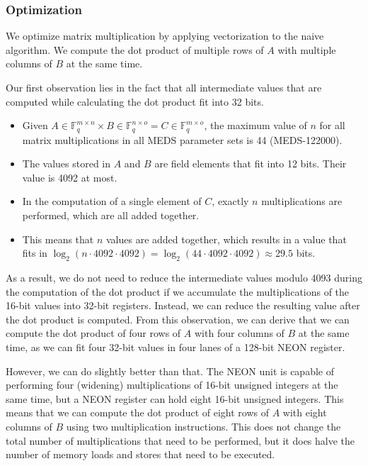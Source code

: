 \documentclass[11pt,a4paper]{report}
\theoremstyle{definition}
\begin{document}
\subsubsection{Optimization}
\label{sec:matrixmultiplicationoptimization}
We optimize matrix multiplication by applying vectorization to the naive algorithm. We compute the dot product of multiple rows of $A$ with multiple columns of $B$ at the same time.

Our first observation lies in the fact that all intermediate values that are computed while calculating the dot product fit into 32 bits.
\begin{itemize}
  \item Given $A \in \mathbb{F}_q^{m \times n} \times B \in \mathbb{F}_q^{n \times o} = C \in \mathbb{F}_q^{m \times o}$, the maximum value of $n$ for all matrix multiplications in all MEDS parameter sets is 44 (MEDS-122000).
  \item The values stored in $A$ and $B$ are field elements that fit into 12 bits. Their value is 4092 at most.
  \item In the computation of a single element of $C$, exactly $n$ multiplications are performed, which are all added together.
  \item This means that $n$ values are added together, which results in a value that fits in $\log_2(n \cdot 4092 \cdot 4092) = \log_2(44 \cdot 4092 \cdot 4092) \approx 29.5$ bits.
\end{itemize}
As a result, we do not need to reduce the intermediate values modulo 4093 during the computation of the dot product if we accumulate the multiplications of the 16-bit values into 32-bit registers. Instead, we can reduce the resulting value after the dot product is computed. From this observation, we can derive that we can compute the dot product of four rows of $A$ with four columns of $B$ at the same time, as we can fit four 32-bit values in four lanes of a 128-bit NEON register.

However, we can do slightly better than that. The NEON unit is capable of performing four (widening) multiplications of 16-bit unsigned integers at the same time, but a NEON register can hold eight 16-bit unsigned integers. This means that we can compute the dot product of eight rows of $A$ with eight columns of $B$ using two multiplication instructions. This does not change the total number of multiplications that need to be performed, but it does halve the number of memory loads and stores that need to be executed.
\end{document}
